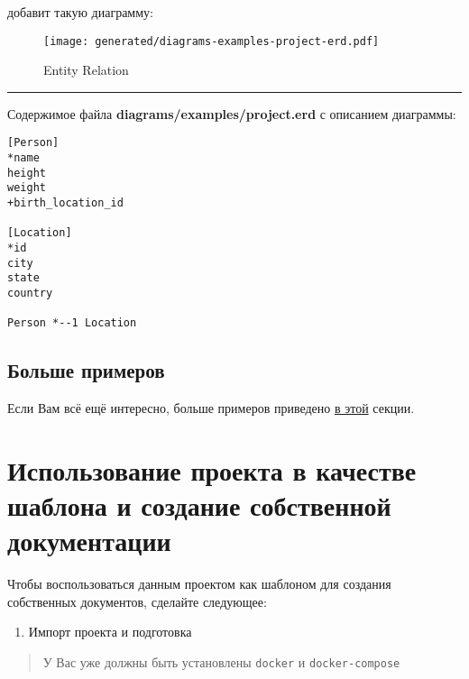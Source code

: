 \documentclass[12pt,a4paper,12pt,oneside,openany]{book}
\providecommand{\tightlist}{%
  \setlength{\itemsep}{0pt}\setlength{\parskip}{0pt}}
\begin{document}
добавит такую диаграмму:

\begin{figure}
\centering
\texttt{[image: generated/diagrams-examples-project-erd.pdf]}
\caption{Entity Relation}
\end{figure}

\begin{center}\rule{0.5\linewidth}{\linethickness}\end{center}

Содержимое файла \textbf{diagrams/examples/project.erd} с описанием диаграммы:

\begin{verbatim}
[Person]
*name
height
weight
+birth_location_id

[Location]
*id
city
state
country

Person *--1 Location
\end{verbatim}

\section{Больше примеров}\label{-}

Если Вам всё ещё интересно, больше примеров приведено \protect\hyperlink{examplesKroki}{в этой} секции.

\hypertarget{as_template}{\chapter{Использование проекта в качестве шаблона и создание собственной документации}\label{as_template}}

Чтобы воспользоваться данным проектом как шаблоном для создания собственных документов, сделайте следующее:

\begin{enumerate}
\def\labelenumi{\arabic{enumi}.}
\tightlist
\item
  Импорт проекта и подготовка
\end{enumerate}

\begin{quote}
У Вас уже должны быть установлены \texttt{docker} и \texttt{docker-compose}
\end{quote}
\end{document}
